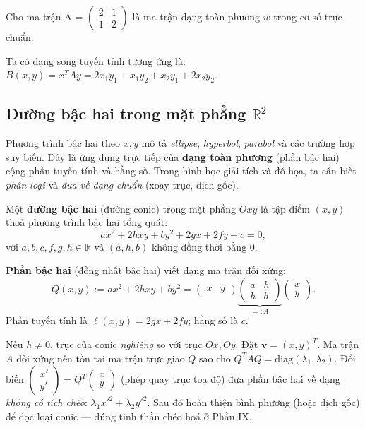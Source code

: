 \documentclass[12pt,a4paper]{article}
\begin{document}
\begin{vidu}[title={Đưa dạng toàn phương về dạng song tuyến tính}]
Cho ma trận A = $\begin{pmatrix}2 & 1\\ 1 & 2\end{pmatrix}$ là ma trận dạng toàn phương $w$ trong cơ sở trực chuẩn.

Ta có dạng song tuyến tính tương ứng là: $B(x, y) = x^T A y = 2x_1 y_1 + x_1 y_2 + x_2 y_1 + 2x_2 y_2$.
\end{vidu}

\subsection{Đường bậc hai trong mặt phẳng $\mathbb{R}^2$}

\begin{dongco}
Phương trình bậc hai theo $x, y$ mô tả \emph{ellipse}, \emph{hyperbol}, \emph{parabol} và các trường hợp suy biến. Đây là ứng dụng trực tiếp của \textbf{dạng toàn phương} (phần bậc hai) cộng phần tuyến tính và hằng số. Trong hình học giải tích và đồ họa, ta cần biết \emph{phân loại} và \emph{đưa về dạng chuẩn} (xoay trục, dịch gốc).
\end{dongco}

\begin{dinhnghia}
  Một \textbf{đường bậc hai} (đường conic) trong mặt phẳng $Oxy$ là tập điểm $(x,y)$ thoả phương trình bậc hai tổng quát:
  \[
    a x^2 + 2h xy + b y^2 + 2g x + 2f y + c = 0,
  \]
  với $a, b, c, f, g, h \in \mathbb{R}$ và $(a, h, b)$ không đồng thời bằng $0$.

  \textbf{Phần bậc hai} (đồng nhất bậc hai) viết dạng ma trận đối xứng:
  \[
    Q(x,y) := a x^2 + 2h xy + b y^2 = \begin{pmatrix}x & y\end{pmatrix}
    \underbrace{\begin{pmatrix}a & h\\ h & b\end{pmatrix}}_{=: A}
    \begin{pmatrix}x\\ y\end{pmatrix}.
  \]
  Phần tuyến tính là $\ell(x,y) = 2gx + 2fy$; hằng số là $c$.
\end{dinhnghia}

\begin{ynghia}[title={Liên hệ với trị riêng và quay trục}]
Nếu $h \ne 0$, trục của conic \emph{nghiêng} so với trục $Ox, Oy$. Đặt $\mathbf{v} = (x,y)^T$. Ma trận $A$ đối xứng nên tồn tại ma trận trực giao $Q$ sao cho $Q^T A Q = \mathrm{diag}(\lambda_1, \lambda_2)$. Đổi biến $\begin{pmatrix}x'\\ y'\end{pmatrix} = Q^T \begin{pmatrix}x\\ y\end{pmatrix}$ (phép quay trục toạ độ) đưa phần bậc hai về dạng \emph{không có tích chéo}: $\lambda_1 x'^2 + \lambda_2 y'^2$. Sau đó hoàn thiện bình phương (hoặc dịch gốc) để đọc loại conic --- đúng tinh thần chéo hoá ở Phần IX.
\end{ynghia}
\end{document}
